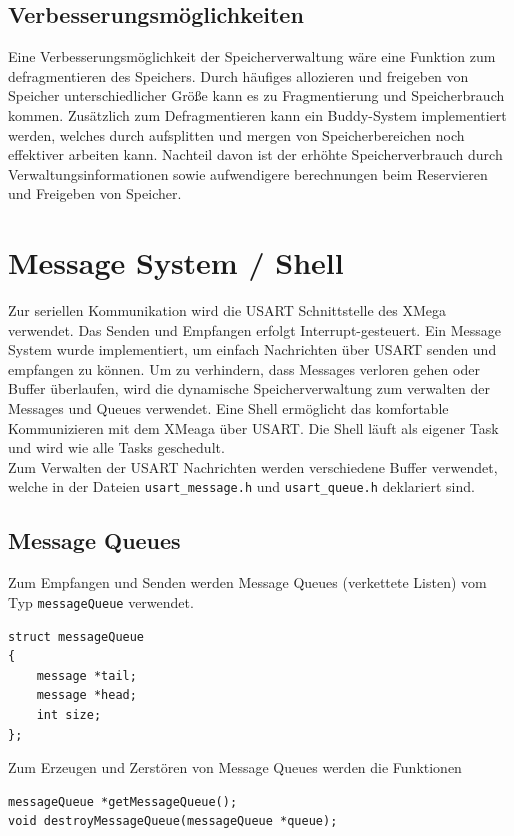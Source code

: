 \documentclass[fontsize=12pt, toc=bibliography, notitlepage]{scrreprt}
\begin{document}
\section{Verbesserungsmöglichkeiten}
Eine Verbesserungsmöglichkeit der Speicherverwaltung wäre eine Funktion zum defragmentieren des Speichers. Durch häufiges allozieren und freigeben von Speicher unterschiedlicher Größe kann es zu Fragmentierung und Speicherbrauch kommen. Zusätzlich zum Defragmentieren kann ein Buddy-System implementiert werden, welches durch aufsplitten und mergen von Speicherbereichen noch effektiver arbeiten kann. Nachteil davon ist der erhöhte Speicherverbrauch durch Verwaltungsinformationen sowie aufwendigere berechnungen beim Reservieren und Freigeben von Speicher.

\chapter{Message System / Shell}
\label{chap:die-shell}
Zur seriellen Kommunikation wird die USART Schnittstelle des XMega verwendet. Das Senden und Empfangen erfolgt Interrupt-gesteuert. Ein Message System wurde implementiert, um einfach Nachrichten über USART senden und empfangen zu können. Um zu verhindern, dass Messages verloren gehen oder Buffer überlaufen, wird die dynamische Speicherverwaltung zum verwalten der Messages und Queues verwendet. Eine Shell ermöglicht das komfortable Kommunizieren mit dem XMeaga über USART. Die Shell läuft als eigener Task und wird wie alle Tasks geschedult.\\

Zum Verwalten der USART Nachrichten werden verschiedene Buffer verwendet, welche in der Dateien \lstinline$usart_message.h$ und \lstinline$usart_queue.h$ deklariert sind.

\section{Message Queues}
\label{subsec:shell-queue}
Zum Empfangen und Senden werden Message Queues (verkettete Listen) vom Typ \lstinline$messageQueue$ verwendet.\\

\begin{lstlisting}
struct messageQueue
{
	message *tail;
	message *head;
	int size;
};
\end{lstlisting}

Zum Erzeugen und Zerstören von Message Queues werden die Funktionen

\begin{lstlisting}
messageQueue *getMessageQueue();
void destroyMessageQueue(messageQueue *queue);
\end{lstlisting}
\end{document}
